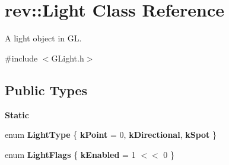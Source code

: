 \hypertarget{classrev_1_1_light}{}\section{rev\+::Light Class Reference}
\label{classrev_1_1_light}


A light object in GL.  




{\ttfamily \#include $<$G\+Light.\+h$>$}

\subsection*{Public Types}
\begin{Indent}\textbf{ Static}\par
\begin{DoxyCompactItemize}
\item 
\mbox{\label{classrev_1_1_light_a51b034df9a472ce8312e117d8edd458f}} 
enum {\bfseries Light\+Type} \{ {\bfseries k\+Point} = 0, 
{\bfseries k\+Directional}, 
{\bfseries k\+Spot}
 \}
\item 
\mbox{\label{classrev_1_1_light_afdf49a31ac80ccb6aa90f0f30bcad5fc}} 
enum {\bfseries Light\+Flags} \{ {\bfseries k\+Enabled} = 1 $<$$<$ 0
 \}
\end{DoxyCompactItemize}
\end{Indent}
